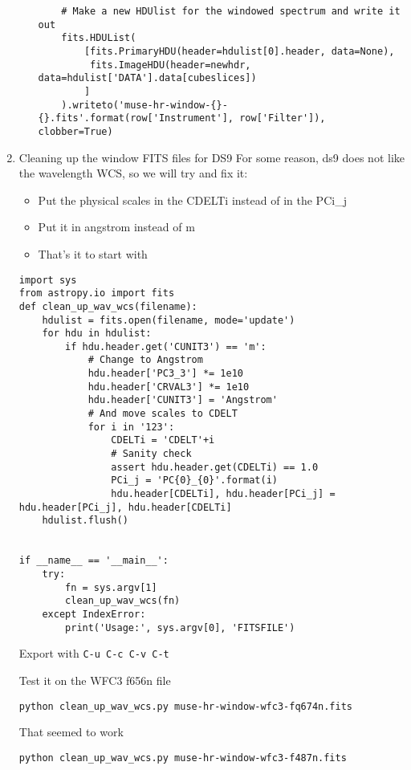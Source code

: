 \documentclass[11pt]{article}
\begin{document}
\begin{enumerate}
\begin{enumerate}
\begin{verbatim}
    # Make a new HDUlist for the windowed spectrum and write it out
    fits.HDUList(
        [fits.PrimaryHDU(header=hdulist[0].header, data=None),
         fits.ImageHDU(header=newhdr, data=hdulist['DATA'].data[cubeslices])
        ]
    ).writeto('muse-hr-window-{}-{}.fits'.format(row['Instrument'], row['Filter']), clobber=True)
\end{verbatim}
\end{enumerate}
\item Cleaning up the window FITS files for DS9
\label{sec:orgheadline28}
For some reason, ds9 does not like the wavelength WCS, so we will try and fix it:
\begin{itemize}
\item Put the physical scales in the CDELTi instead of in the PCi\_j
\item Put it in angstrom instead of m
\item That's it to start with
\end{itemize}
\begin{verbatim}
import sys
from astropy.io import fits
def clean_up_wav_wcs(filename):
    hdulist = fits.open(filename, mode='update')
    for hdu in hdulist:
        if hdu.header.get('CUNIT3') == 'm':
            # Change to Angstrom
            hdu.header['PC3_3'] *= 1e10
            hdu.header['CRVAL3'] *= 1e10
            hdu.header['CUNIT3'] = 'Angstrom'
            # And move scales to CDELT
            for i in '123':
                CDELTi = 'CDELT'+i
                # Sanity check
                assert hdu.header.get(CDELTi) == 1.0
                PCi_j = 'PC{0}_{0}'.format(i)
                hdu.header[CDELTi], hdu.header[PCi_j] = hdu.header[PCi_j], hdu.header[CDELTi] 
    hdulist.flush()


if __name__ == '__main__':
    try:
        fn = sys.argv[1]
        clean_up_wav_wcs(fn)
    except IndexError:
        print('Usage:', sys.argv[0], 'FITSFILE')
\end{verbatim}
Export with \texttt{C-u C-c C-v C-t}

Test it on the WFC3 f656n file

\begin{verbatim}
python clean_up_wav_wcs.py muse-hr-window-wfc3-fq674n.fits
\end{verbatim}

That seemed to work

\begin{verbatim}
python clean_up_wav_wcs.py muse-hr-window-wfc3-f487n.fits
\end{verbatim}


\end{enumerate}
\end{document}
